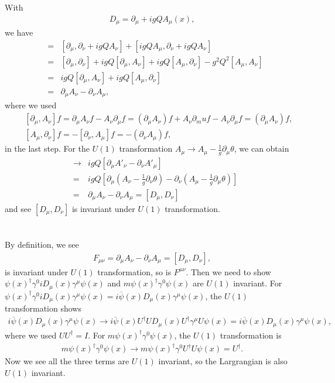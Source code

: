 \documentclass[11pt]{article}
\def\del{{\partial}}
\begin{document}
\section{ }
With 
\begin{eqnarray}
    D_\mu=\del_\mu + i g Q A_\mu (x),
\end{eqnarray}
we have
\begin{eqnarray}
    [D_\mu, D_\nu] &=& [\del_\mu, \del_\nu + i g Q A_\nu ]+[i g Q A_\mu, \del_\nu + i g Q A_\nu ] \\
    &=& [\del_\mu, \del_\nu] + igQ[\del_\mu, A_\nu]+igQ[A_\mu, \del_\nu]-g^2Q^2[A_\mu, A_\nu] \\
    &=&i g Q [\del_\mu,A_\nu]+igQ[A_\mu,\del_\nu]\\
    &=& \del_\mu A_\nu-\del_\nu A_\mu,
\end{eqnarray}
where we used
\begin{eqnarray}
    &&[\del_\mu, A_\nu]f= \del_\mu A_\nu f -A_\nu \del_\mu f = (\del_\mu A_\nu)f+A_\nu \del_mu f-A_\nu \del_\mu f =(\del_\mu A_\nu)f,\\
    &&[A_\mu, \del_\nu]f=-[\del_\nu, A_\mu]f=- (\del_\nu A_\mu)f,
\end{eqnarray}
in the last step.
For the $U(1)$ transformation $A_\mu \to A_\mu -\frac{1}{g} \del_\mu \theta$, we can obtain
\begin{eqnarray}
    [D_\mu, D_\nu] &\to & igQ [\del_\mu A'_\nu-\del_\nu A'_\mu]\\
    &=&igQ [\del_\mu (A_\nu-\frac{1}{g} \del_\nu \theta)-\del_\nu (A_\mu-\frac{1}{g} \del_\mu \theta)]\\
    &=& \del_\mu A_\nu-\del_\nu A_\mu = [D_\mu, D_\nu]
\end{eqnarray}
and see $[D_\mu, D_\nu]$ is invariant under $U(1)$ transformation.

\section { }
By definition, we see
\begin{eqnarray}
    F_{\mu \nu} = \del_\mu A_\nu-\del_\nu A_\mu = [D_\mu, D_\nu],
\end{eqnarray}
is invariant under $U(1)$ transformation, so is $F^{\mu \nu}$. Then we need to show $\psi(x)^\dagger \gamma^0 i D_\mu(x) \gamma^\mu \psi(x)$ and $m \psi(x)^\dagger \gamma^0 \psi(x)$ are $U(1)$ invariant. For $\psi(x)^\dagger \gamma^0 i D_\mu(x) \gamma^\mu \psi(x) = i{\overline \psi(x)}  D_\mu(x) \gamma^\mu \psi(x)$, the $U(1)$ transformation shows
\begin{eqnarray}
    i{\overline \psi(x)}  D_\mu(x) \gamma^\mu \psi(x) \to i {\overline \psi(x)}  U^\dagger U D_\mu(x) U^\dagger \gamma^\mu U \psi(x) =  i{\overline \psi(x)}  D_\mu(x) \gamma^\mu \psi(x),
\end{eqnarray}
where we used $U U^\dagger = I$.
For $m \psi(x)^\dagger \gamma^0 \psi(x)$, the $U(1)$ transformation is
\begin{eqnarray}
    m \psi(x)^\dagger \gamma^0 \psi(x) \to  m \psi(x)^\dagger \gamma^0 U^\dagger U \psi(x) = U^\dagger.
\end{eqnarray}
Now we see all the three terms are $U(1)$ invariant, so the Largrangian is also $U(1)$ invariant.
\end{document}
